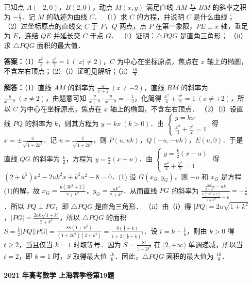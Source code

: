 \documentclass[UTF8,a4paper,11pt]{ctexart}
\begin{document}
已知点 $A(-2,0)$，$B(2,0)$，动点 $M(x,y)$ 满足直线 $AM$ 与 $BM$ 的斜率之积为 $-\frac{1}{2}$．记 $M$ 的轨迹为曲线 $C$．
（1）求 $C$ 的方程，并说明 $C$ 是什么曲线；
（2）过坐标原点的直线交 $C$ 于 $P$，$Q$ 两点，点 $P$ 在第一象限，$PE\perp x$ 轴，垂足为 $E$，连结 $QE$ 并延长交 $C$ 于点 $G$．
     （i）证明：$\triangle PQG$ 是直角三角形；
     （ii）求 $\triangle PQG$ 面积的最大值．

\textbf{答案：}（1）$\frac{x^2}{4}+\frac{y^2}{2}=1\ (|x|\neq 2)$，$C$ 为中心在坐标原点，焦点在 $x$ 轴上的椭圆，不含左右顶点；（2）（i）证明见解析；（ii）$\frac{16}{9}$\par

\textbf{解答：}（1）直线 $AM$ 的斜率为 $\frac{y}{x+2}\ (x\neq -2)$，直线 $BM$ 的斜率为 $\frac{y}{x-2}\ (x\neq 2)$，由题意可知 $\frac{y}{x+2}\cdot\frac{y}{x-2}=-\frac{1}{2}$，化简得 $\frac{x^2}{4}+\frac{y^2}{2}=1\ (x\neq\pm 2)$，所以 $C$ 为中心在坐标原点，焦点在 $x$ 轴上的椭圆，不含左右顶点．
（2）（i）设直线 $PQ$ 的斜率为 $k$，则其方程为 $y=kx\ (k>0)$．由 $\begin{cases} y=kx \\ \frac{x^2}{4}+\frac{y^2}{2}=1 \end{cases}$ 得 $x=\pm\frac{2}{\sqrt{1+2k^2}}$．记 $u=\frac{2}{\sqrt{1+2k^2}}$，则 $P(u,uk)$，$Q(-u,-uk)$，$E(u,0)$．于是直线 $QG$ 的斜率为 $\frac{k}{2}$，方程为 $y=\frac{k}{2}(x-u)$．由 $\begin{cases} y=\frac{k}{2}(x-u) \\ \frac{x^2}{4}+\frac{y^2}{2}=1 \end{cases}$ 得 $(2+k^2)x^2-2uk^2x+k^2u^2-8=0$．(1) 设 $G(x_G,y_G)$，则 $-u$ 和 $x_G$ 是方程(1)的解，故 $x_G=\frac{u(3k^2+2)}{2+k^2}$，$y_G=\frac{uk^3}{2+k^2}$．从而直线 $PG$ 的斜率为 $\frac{\frac{uk^3}{2+k^2}-uk}{\frac{u(3k^2+2)}{2+k^2}-u}=-\frac{1}{k}$．所以 $PQ\perp PG$，即 $\triangle PQG$ 是直角三角形．
（ii）由（i）得 $|PQ|=2u\sqrt{1+k^2}$，$|PG|=\frac{2uk\sqrt{1+k^2}}{2+k^2}$，所以 $\triangle PQG$ 的面积 $S=\frac{1}{2}|PQ||PG|=\frac{8k(1+k^2)}{(1+2k^2)(2+k^2)}=\frac{8(\frac{1}{k}+k)}{1+2(\frac{1}{k}+k)^2}$．设 $t=k+\frac{1}{k}$，则由 $k>0$ 得 $t\geq 2$，当且仅当 $k=1$ 时取等号．因为 $S=\frac{8t}{1+2t^2}$ 在 $[2,+\infty)$ 单调递减，所以当 $t=2$，即 $k=1$ 时，$S$ 取得最大值 $\frac{16}{9}$．因此，$\triangle PQG$ 面积的最大值为 $\frac{16}{9}$．

\paragraph{2021 年高考数学 上海春季卷第19题}
\end{document}
